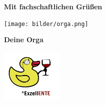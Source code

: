 \documentclass{scrbook}
\begin{document}



\newpage


  \vspace*{2cm}

  \Huge \textbf{Mit fachschaftlichen Grüßen}

  \vspace{1.5cm}

  \texttt{[image: bilder/orga.png]}

  \vspace{1cm}

  \begin{minipage}{0.6\textwidth}
    \hspace*{0.5cm} \Huge \textbf{Deine Orga}
  \end{minipage}
  \hfill
  \begin{minipage}{0.3\textwidth}
    \includegraphics[width=3cm]{bilder/exzellente.png}
  \end{minipage}
\end{document}
